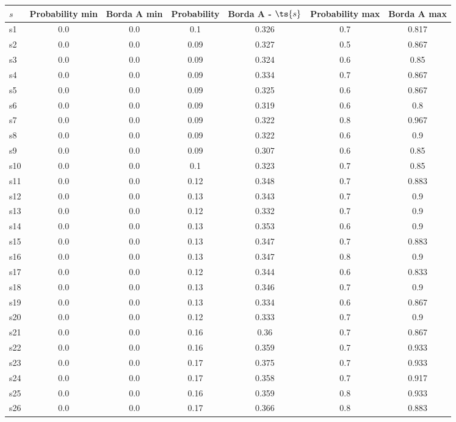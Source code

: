 \documentclass{article}
\begin{document}
\noindent\begin{tabular}{|l|c|c|c|c|c|c|}
\hline
$s$& Probability min & Borda A min & Probability & Borda A - $\ts{s}$ & Probability max & Borda A max\\
\hline
s1 &0.0 & 0.0 & 0.1 & 0.326 & 0.7 & 0.817\\
\hline
s2 &0.0 & 0.0 & 0.09 & 0.327 & 0.5 & 0.867\\
\hline
s3 &0.0 & 0.0 & 0.09 & 0.324 & 0.6 & 0.85\\
\hline
s4 &0.0 & 0.0 & 0.09 & 0.334 & 0.7 & 0.867\\
\hline
s5 &0.0 & 0.0 & 0.09 & 0.325 & 0.6 & 0.867\\
\hline
s6 &0.0 & 0.0 & 0.09 & 0.319 & 0.6 & 0.8\\
\hline
s7 &0.0 & 0.0 & 0.09 & 0.322 & 0.8 & 0.967\\
\hline
s8 &0.0 & 0.0 & 0.09 & 0.322 & 0.6 & 0.9\\
\hline
s9 &0.0 & 0.0 & 0.09 & 0.307 & 0.6 & 0.85\\
\hline
s10 &0.0 & 0.0 & 0.1 & 0.323 & 0.7 & 0.85\\
\hline
s11 &0.0 & 0.0 & 0.12 & 0.348 & 0.7 & 0.883\\
\hline
s12 &0.0 & 0.0 & 0.13 & 0.343 & 0.7 & 0.9\\
\hline
s13 &0.0 & 0.0 & 0.12 & 0.332 & 0.7 & 0.9\\
\hline
s14 &0.0 & 0.0 & 0.13 & 0.353 & 0.6 & 0.9\\
\hline
s15 &0.0 & 0.0 & 0.13 & 0.347 & 0.7 & 0.883\\
\hline
s16 &0.0 & 0.0 & 0.13 & 0.347 & 0.8 & 0.9\\
\hline
s17 &0.0 & 0.0 & 0.12 & 0.344 & 0.6 & 0.833\\
\hline
s18 &0.0 & 0.0 & 0.13 & 0.346 & 0.7 & 0.9\\
\hline
s19 &0.0 & 0.0 & 0.13 & 0.334 & 0.6 & 0.867\\
\hline
s20 &0.0 & 0.0 & 0.12 & 0.333 & 0.7 & 0.9\\
\hline
s21 &0.0 & 0.0 & 0.16 & 0.36 & 0.7 & 0.867\\
\hline
s22 &0.0 & 0.0 & 0.16 & 0.359 & 0.7 & 0.933\\
\hline
s23 &0.0 & 0.0 & 0.17 & 0.375 & 0.7 & 0.933\\
\hline
s24 &0.0 & 0.0 & 0.17 & 0.358 & 0.7 & 0.917\\
\hline
s25 &0.0 & 0.0 & 0.16 & 0.359 & 0.8 & 0.933\\
\hline
s26 &0.0 & 0.0 & 0.17 & 0.366 & 0.8 & 0.883\\

\end{tabular}
\end{document}
